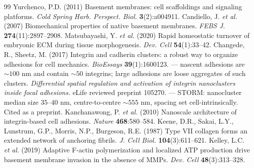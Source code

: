 \documentclass[10pt,a4paper]{article}
\begin{document}
{\begin{thebibliography}{99}
 Yurchenco, P.D. (2011) Basement membranes: cell scaffoldings and signaling
platforms. \emph{Cold Spring Harb. Perspect. Biol.} \textbf{3}(2):a004911.
 Candiello, J. \emph{et al.} (2007) Biomechanical properties of native basement
membranes. \emph{FEBS J.} \textbf{274}(11):2897--2908.
 Matsubayashi, Y. \emph{et al.} (2020) Rapid homeostatic turnover of
embryonic ECM during tissue morphogenesis. \emph{Dev. Cell} \textbf{54}(1):33--42.
 Changede, R., Sheetz, M. (2017) Integrin and cadherin clusters: a robust
way to organize adhesions for cell mechanics. \emph{BioEssays} \textbf{39}(1):1600123. --- nascent
adhesions are $\sim\!100$ nm and contain $\sim\!50$ integrins; large adhesions are loose aggregates of
such clusters.
 \emph{Differential spatial regulation and activation of integrin
nanoclusters inside focal adhesions.} eLife reviewed preprint 105270. --- STORM: nanocluster median
size $35$--$40$ nm, centre-to-centre $\sim\!555$ nm, spacing set cell-intrinsically. Cited as a
preprint.
 Kanchanawong, P. \emph{et al.} (2010) Nanoscale architecture of
integrin-based cell adhesions. \emph{Nature} \textbf{468}:580--584.
 Keene, D.R., Sakai, L.Y., Lunstrum, G.P., Morris, N.P., Burgeson, R.E. (1987)
Type VII collagen forms an extended network of anchoring fibrils. \emph{J. Cell Biol.}
\textbf{104}(3):611--621.
 Kelley, L.C. \emph{et al.} (2019) Adaptive F-actin polymerization and localized
ATP production drive basement membrane invasion in the absence of MMPs. \emph{Dev. Cell}
\textbf{48}(3):313--328.
\end{thebibliography}}
\end{document}
